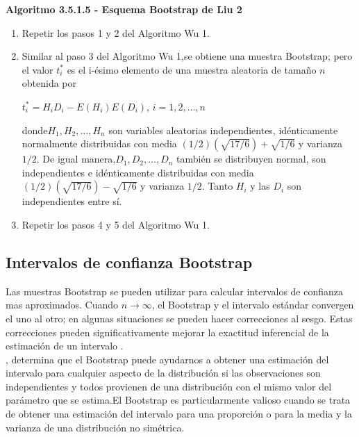 \textbf{Algoritmo 3.5.1.5 - Esquema Bootstrap de Liu 2}

\begin{enumerate}
	\item Repetir los pasos 1 y 2 del Algoritmo Wu 1.
	
	\item  Similar al paso 3 del Algoritmo Wu 1,se obtiene una muestra Bootstrap;
	pero el valor $t^{*}_{i}$ es el i-ésimo elemento de una muestra aleatoria de tamaño $n$ obtenida por 
	
	\begin{center}
		$t^{*}_{i} = H_{i}D_{i}- E(H_{i})E(D_{i})$,\hspace{.5cm} $i = 1,2, \dots, n$
	\end{center}
	
	donde$ H_{1},H_{2}, \dots,H_{n}$ son variables aleatorias independientes, idénticamente normalmente distribuidas con media $(1/2)( \sqrt{17/6})+ \sqrt{1/6}$ y varianza $1/2$. De igual manera,$ D_{1},D_{2}, \dots,D_{n}$ también se distribuyen normal, son independientes e idénticamente
	distribuidas con media $(1/2)( \sqrt{17/6})- \sqrt{1/6}$ y varianza  $1/2$. Tanto $ H_{i}$ y las $ D_{i}$ son independientes entre sí.
	
	\item Repetir los pasos 4 y 5 del Algoritmo Wu 1.
\end{enumerate}



\subsection{Intervalos de confianza Bootstrap}
Las muestras Bootstrap se pueden utilizar para calcular intervalos de confianza mas aproximados. Cuando $n \rightarrow \infty$, el Bootstrap y el intervalo estándar convergen el uno al otro; en algunas situaciones se pueden hacer correcciones al sesgo. Estas correcciones pueden significativamente mejorar la exactitud inferencial de la estimación de un intervalo \parencite{efron-tibs-1993}.\\


\textcite{good-2005}, determina que el Bootstrap puede ayudarnos a obtener una estimación del intervalo para cualquier aspecto de la distribución si las observaciones son independientes y todos provienen de una distribución con el mismo valor del parámetro que se estima.El Bootstrap es particularmente valioso cuando se trata de obtener una estimación del intervalo para una proporción o para la media y la varianza de una distribución no simétrica.\\


